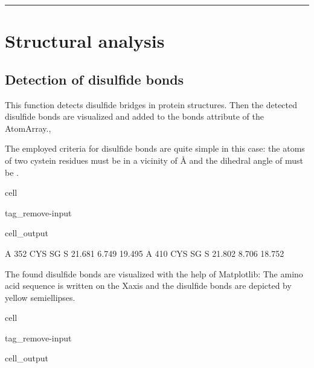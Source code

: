 \documentclass[letterpaper,10pt,english]{jupyterBook}
\begin{document}
\bigskip\hrule\bigskip


\sphinxstepscope


\chapter{Structural analysis}
\label{\detokenize{ipynb/chapter3:structural-analysis}}\label{\detokenize{ipynb/chapter3::doc}}

\section{Detection of disulfide bonds}
\label{\detokenize{ipynb/chapter3:detection-of-disulfide-bonds}}
\sphinxAtStartPar
This function detects disulfide bridges in protein structures. Then the detected disulfide bonds are visualized and added to the bonds attribute of the AtomArray.,

\sphinxAtStartPar
The employed criteria for disulfide bonds are quite simple in this case: the atoms of two cystein residues must be in a vicinity of Å and the dihedral angle of must be .

\begin{sphinxuseclass}{cell}
\begin{sphinxuseclass}{tag_remove-input}\begin{sphinxVerbatimOutput}

\begin{sphinxuseclass}{cell_output}
\begin{sphinxVerbatim}[commandchars=\\\{\}]
    A     352  CYS SG     S       \PYGZhy{}21.681    6.749   19.495
    A     410  CYS SG     S       \PYGZhy{}21.802    8.706   18.752
\end{sphinxVerbatim}

\end{sphinxuseclass}\end{sphinxVerbatimOutput}

\end{sphinxuseclass}
\end{sphinxuseclass}
\sphinxAtStartPar
The found disulfide bonds are visualized with the help of Matplotlib: The amino acid sequence is written on the X\sphinxhyphen{}axis and the disulfide bonds are depicted by yellow semi\sphinxhyphen{}ellipses.

\begin{sphinxuseclass}{cell}
\begin{sphinxuseclass}{tag_remove-input}\begin{sphinxVerbatimOutput}

\begin{sphinxuseclass}{cell_output}
\noindent{}

\end{sphinxuseclass}\end{sphinxVerbatimOutput}

\end{sphinxuseclass}
\end{sphinxuseclass}
\end{document}
